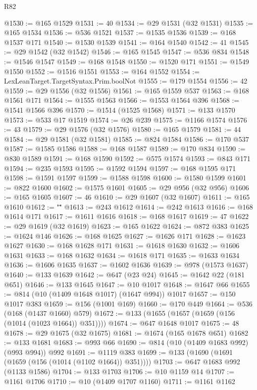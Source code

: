 \begin{lexlean}{R82}
\begin{coremodule}
@1530 := @165 @1529
@1531 := 40
@1534 := @29 @1531 (@32 @1531)
@1535 := @165 @1534
@1536 := @536 @1521
@1537 := @1535 @1536
@1539 := @168 @1537 @171
@1540 := @1530 @1539
@1541 := @164 @1540
@1542 := 41
@1545 := @29 @1542 (@32 @1542)
@1546 := @165 @1545
@1547 := @536 @834
@1548 := @1546 @1547
@1549 := @168 @1548
@1550 := @1520 @171
@1551 := @1549 @1550
@1552 := @1516 @1551
@1553 := @164 @1552
@1554 := LexLeanTarget.TargetSyntax.Prim.boolNot
@1555 := @179 @1554
@1556 := 42
@1559 := @29 @1556 (@32 @1556)
@1561 := @165 @1559 @537
@1563 := @168 @1561 @171
@1564 := @1555 @1563
@1566 := @1553 @1564 @396
@1568 := @1541 @1566 @396
@1570 := @1514 (@1525 @1568)
@1571 := @133 @1570
@1573 := @533 @17 @1519
@1574 := @26 @239
@1575 := @1166 @1574
@1576 := 43
@1579 := @29 @1576 (@32 @1576)
@1580 := @165 @1579
@1581 := 44
@1584 := @29 @1581 (@32 @1581)
@1585 := @824 @1584
@1586 := @170 @537
@1587 := @1585 @1586
@1588 := @168 @1587
@1589 := @170 @834
@1590 := @830 @1589
@1591 := @168 @1590
@1592 := @575 @1574
@1593 := @843 @171
@1594 := @235 @1593
@1595 := @1592 @1594
@1597 := @168 @1595 @171
@1598 := @1591 @1597
@1599 := @1588 @1598
@1600 := @1580 @1599
@1601 := @822 @1600
@1602 := @1575 @1601
@1605 := @29 @956 (@32 @956)
@1606 := @165 @1605
@1607 := 46
@1610 := @29 @1607 (@32 @1607)
@1611 := @165 @1610
@1612 := "\""
@1613 := @243 @1612
@1614 := @242 @1613
@1616 := @168 @1614 @171
@1617 := @1611 @1616
@1618 := @168 @1617
@1619 := 47
@1622 := @29 @1619 (@32 @1619)
@1623 := @165 @1622
@1624 := @872 @383
@1625 := @1624 @146
@1626 := @168 @1625
@1627 := @1626 @171
@1628 := @1623 @1627
@1630 := @168 @1628 @171
@1631 := @1618 @1630
@1632 := @1606 @1631
@1633 := @168 @1632
@1634 := @1618 @171
@1635 := @1633 @1634
@1636 := @1606 @1635
@1637 := @1602 @1636
@1639 := @978 (@1573 @1637)
@1640 := @133 @1639
@1642 := @647 (@23 @24)
@1645 := @1642 @22 (@181 @651)
@1646 := @133 @1645
@1647 := @10 @1017
@1648 := @1647 @66
@1655 := @814 (@10 (@1409 @1648 @1017) (@1647 @994)) @1017
@1657 := @150 @1017 @383
@1659 := @156 (@1001 @169)
@1660 := @170 @449
@1664 := @536 (@168 (@1437 @1660) @579)
@1672 := @133 (@1655 (@1657 (@1659 (@156 (@1014 (@1023 @1664)) @351))))
@1674 := @647 @1648 @1017
@1675 := 48
@1678 := @29 @1675 (@32 @1675)
@1681 := @1674 (@165 @1678 @651)
@1682 := @133 @1681
@1683 := @993 @66
@1690 := @814 (@10 (@1409 @1683 @992) (@993 @994)) @992
@1691 := @1119 @383
@1699 := @133 (@1690 (@1691 (@1659 (@156 (@1014 (@1102 @1664)) @351))))
@1703 := @647 @1683 @992 (@1133 @1586)
@1704 := @133 @1703
@1706 := @10 @1159 @14
@1707 := @1161 @1706
@1710 := @10 (@1409 @1707 @1160)
@1711 := @1161 @1162

\end{coremodule}
\end{lexlean}
